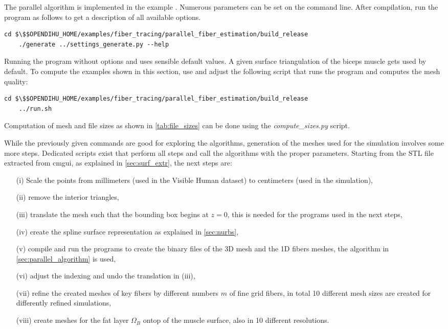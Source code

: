 \label{sec:repro_tendon_meshes}
\begin{reproduce}
  The parallel algorithm is implemented in the example . 
  Numerous parameters can be set on the command line. After compilation, run the program as follows to get a description of all available options.
  \begin{lstlisting}[columns=fullflexible,breaklines=true,postbreak=\mbox{\textcolor{gray}{$\hookrightarrow$}\space}]
    cd $\$$OPENDIHU_HOME/examples/fiber_tracing/parallel_fiber_estimation/build_release
    ./generate ../settings_generate.py --help
  \end{lstlisting}
  Running the program without options and  uses sensible default values. A given surface triangulation of the biceps muscle gets used by default. To compute the examples shown in this section, use and adjust the following script that runs the  program and computes the mesh quality:
  \begin{lstlisting}[columns=fullflexible,breaklines=true,postbreak=\mbox{\textcolor{gray}{$\hookrightarrow$}\space}]
    cd $\$$OPENDIHU_HOME/examples/fiber_tracing/parallel_fiber_estimation/build_release
    ../run.sh
  \end{lstlisting}
  Computation of mesh and file sizes as shown in \cref{tab:file_sizes} can be done using the \emph{compute\_sizes.py} script.
  
  While the previously given commands are good for exploring the algorithms, generation of the meshes used for the simulation involves some more steps. Dedicated scripts exist that perform all steps and call the algorithms with the proper parameters.
  Starting from the STL file extracted from cmgui, as explained in \cref{sec:surf_extr}, the next steps are: 
  \begin{itemize}[leftmargin=1cm]
  \item[(i)] Scale the points from millimeters (used in the Visible Human dataset) to centimeters (used in the simulation), 
  \item[(ii)] remove the interior triangles, 
  \item[(iii)] translate the mesh such that the bounding box begins at $z=0$, this is needed for the programs used in the next steps, 
  \item[(iv)] create the spline surface representation as explained in \cref{sec:nurbs}, 
  \item[(v)] compile and run the \opendihu{} programs to create the binary files of the 3D mesh and the 1D fibers meshes, the algorithm in \cref{sec:parallel_algorithm} is used, 
  \item[(vi)] adjust the indexing and undo the translation in (iii), \item[(vii)] refine the created meshes of key fibers by different numbers $m$ of fine grid fibers, in total 10 different mesh sizes are created for differently refined simulations, 
  \item[(viii)] create meshes for the fat layer $\Omega_B$ ontop of the muscle surface, also in 10 different resolutions.
  \end{itemize}
  

\end{reproduce}
